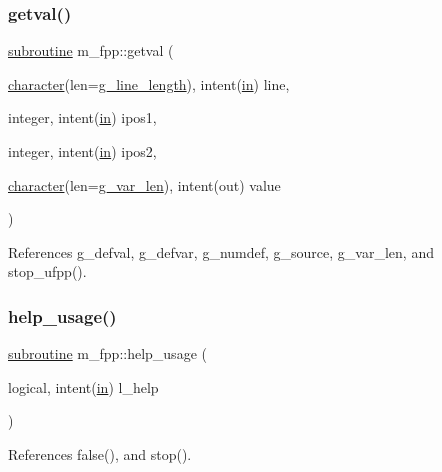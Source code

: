 \subsubsection{\texorpdfstring{getval()}{getval()}}
{\footnotesize\ttfamily \hyperlink{M__stopwatch_83_8txt_acfbcff50169d691ff02d4a123ed70482}{subroutine} m\+\_\+fpp\+::getval (\begin{DoxyParamCaption}\item[{\hyperlink{option__stopwatch_83_8txt_abd4b21fbbd175834027b5224bfe97e66}{character}(len=\hyperlink{namespacem__fpp_ab93f8756cf248cf8db932573009d4664}{g\+\_\+line\+\_\+length}), intent(\hyperlink{M__journal_83_8txt_afce72651d1eed785a2132bee863b2f38}{in})}]{line,  }\item[{integer, intent(\hyperlink{M__journal_83_8txt_afce72651d1eed785a2132bee863b2f38}{in})}]{ipos1,  }\item[{integer, intent(\hyperlink{M__journal_83_8txt_afce72651d1eed785a2132bee863b2f38}{in})}]{ipos2,  }\item[{\hyperlink{option__stopwatch_83_8txt_abd4b21fbbd175834027b5224bfe97e66}{character}(len=\hyperlink{namespacem__fpp_a99c57ea4a304975a7afafcf0b292db06}{g\+\_\+var\+\_\+len}), intent(out)}]{value }\end{DoxyParamCaption})}



References g\+\_\+defval, g\+\_\+defvar, g\+\_\+numdef, g\+\_\+source, g\+\_\+var\+\_\+len, and stop\+\_\+ufpp().

\mbox{\label{namespacem__fpp_a17c5179799e6700fe39fb3bd2ec85d01}} 
\subsubsection{\texorpdfstring{help\+\_\+usage()}{help\_usage()}}
{\footnotesize\ttfamily \hyperlink{M__stopwatch_83_8txt_acfbcff50169d691ff02d4a123ed70482}{subroutine} m\+\_\+fpp\+::help\+\_\+usage (\begin{DoxyParamCaption}\item[{logical, intent(\hyperlink{M__journal_83_8txt_afce72651d1eed785a2132bee863b2f38}{in})}]{l\+\_\+help }\end{DoxyParamCaption})}



References false(), and stop().

\mbox{\label{namespacem__fpp_a7a571f61ee26c2a637c1530d2271ab23}} 
